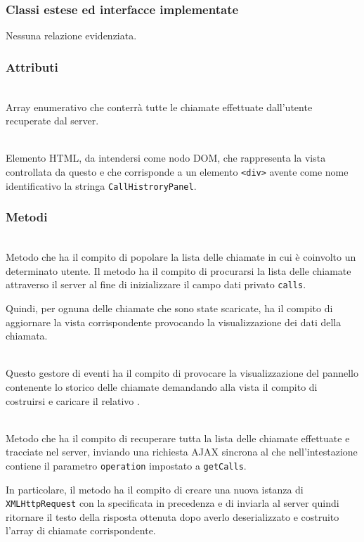 \subsubsection*{Classi estese ed interfacce implementate}
Nessuna relazione evidenziata.

\subsubsection*{Attributi}
\begin{description}
  \item{}\\
  Array enumerativo che conterrà tutte le chiamate effettuate dall'utente recuperate dal server.
  \item{}\\
  Elemento HTML, da intendersi come nodo DOM, che rappresenta la vista controllata da questo  e che corrisponde a un elemento \verb'<div>' avente come nome identificativo la stringa \verb'CallHistroryPanel'.
\end{description}

\subsubsection*{Metodi}
\begin{description}

  \item{}\\
  Metodo che ha il compito di popolare la lista delle chiamate in cui è coinvolto un determinato utente. Il metodo ha il compito di procurarsi la lista delle chiamate attraverso il server al fine di inizializzare il campo dati privato \verb'calls'.
  
  Quindi, per ognuna delle chiamate che sono state scaricate, ha il compito di aggiornare la vista corrispondente provocando la visualizzazione dei dati della chiamata.
  
  \item{}\\
  Questo gestore di eventi ha il compito di provocare la visualizzazione del pannello contenente lo storico delle chiamate demandando alla vista il compito di costruirsi e caricare il relativo .
  
    \item{}\\
  Metodo che ha il compito di recuperare tutta la lista delle chiamate effettuate e tracciate nel server, inviando una richiesta AJAX sincrona al  che nell'intestazione contiene il parametro \verb'operation' impostato a \verb'getCalls'.
  
  In particolare, il metodo ha il compito di creare una nuova istanza di \verb'XMLHttpRequest' con la  specificata in precedenza e di inviarla al server quindi ritornare il testo della risposta ottenuta dopo averlo deserializzato e costruito l'array di chiamate corrispondente.

\end{description}


